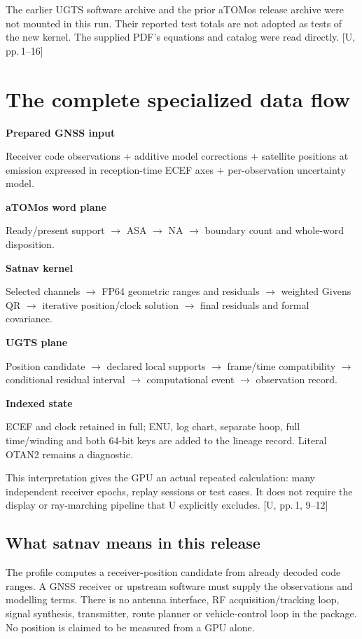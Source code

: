 \documentclass[11pt,a4paper]{article}
\newcommand{\src}[1]{\textcolor{muted}{[U, #1]}}
\begin{document}
The earlier UGTS software archive and the prior aTOMos release archive were not mounted
in this run. Their reported test totals are not adopted as tests of the new kernel.
The supplied PDF's equations and catalog were read directly. \src{pp.\,1--16}
\clearpage

\section*{The complete specialized data flow}
\begin{panel}
\textbf{Prepared GNSS input}\par
Receiver code observations + additive model corrections + satellite positions at
emission expressed in reception-time ECEF axes + per-observation uncertainty model.\par
\textbf{aTOMos word plane}\par
Ready/present support $\to$ ASA $\to$ NA $\to$ boundary count and whole-word disposition.\par
\textbf{Satnav kernel}\par
Selected channels $\to$ FP64 geometric ranges and residuals $\to$ weighted Givens QR
$\to$ iterative position/clock solution $\to$ final residuals and formal covariance.\par
\textbf{UGTS plane}\par
Position candidate $\to$ declared local supports $\to$ frame/time compatibility
$\to$ conditional residual interval $\to$ computational event $\to$ observation record.\par
\textbf{Indexed state}\par
ECEF and clock retained in full; ENU, log chart, separate hoop, full time/winding and
both 64-bit keys are added to the lineage record. Literal OTAN2 remains a diagnostic.
\end{panel}

This interpretation gives the GPU an actual repeated calculation: many independent
receiver epochs, replay sessions or test cases. It does not require the display or
ray-marching pipeline that U explicitly excludes. \src{pp.\,1, 9--12}

\subsection*{What satnav means in this release}
The profile computes a receiver-position candidate from already decoded code ranges.
A GNSS receiver or upstream software must supply the observations and modelling terms.
There is no antenna interface, RF acquisition/tracking loop, signal synthesis,
transmitter, route planner or vehicle-control loop in the package. No position is
claimed to be measured from a GPU alone.
\end{document}
